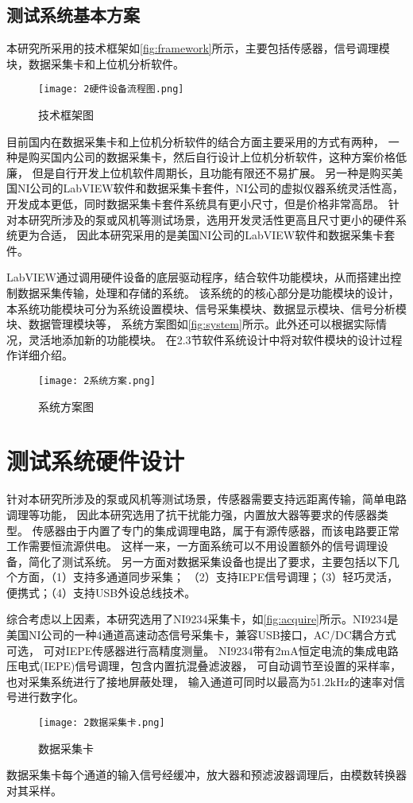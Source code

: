 \subsection{测试系统基本方案}
本研究所采用的技术框架如\autoref{fig:framework}所示，主要包括传感器，信号调理模块，数据采集卡和上位机分析软件。
\begin{figure}[htbp]
    \centering
    \texttt{[image: 2硬件设备流程图.png]}
    \caption{\label{fig:framework}技术框架图}
\end{figure}

目前国内在数据采集卡和上位机分析软件的结合方面主要采用的方式有两种，
一种是购买国内公司的数据采集卡，然后自行设计上位机分析软件，这种方案价格低廉，
但是自行开发上位机软件周期长，且功能有限还不易扩展。
另一种是购买美国NI公司的LabVIEW软件和数据采集卡套件，NI公司的虚拟仪器系统灵活性高，
开发成本更低，同时数据采集卡套件系统具有更小尺寸，但是价格非常高昂。
针对本研究所涉及的泵或风机等测试场景，选用开发灵活性更高且尺寸更小的硬件系统更为合适，
因此本研究采用的是美国NI公司的LabVIEW软件和数据采集卡套件。

LabVIEW通过调用硬件设备的底层驱动程序，结合软件功能模块，从而搭建出控制数据采集传输，处理和存储的系统。
该系统的的核心部分是功能模块的设计，本系统功能模块可分为系统设置模块、信号采集模块、数据显示模块、信号分析模块、数据管理模块等，
系统方案图如\autoref{fig:system}所示。此外还可以根据实际情况，灵活地添加新的功能模块。
在2.3节软件系统设计中将对软件模块的设计过程作详细介绍。
\begin{figure}[htbp]
    \centering
    \texttt{[image: 2系统方案.png]}
    \caption{\label{fig:system}系统方案图}
\end{figure}

\section{测试系统硬件设计}
针对本研究所涉及的泵或风机等测试场景，传感器需要支持远距离传输，简单电路调理等功能，
因此本研究选用了抗干扰能力强，内置放大器等要求的传感器类型。
传感器由于内置了专门的集成调理电路，属于有源传感器，而该电路要正常工作需要恒流源供电。
这样一来，一方面系统可以不用设置额外的信号调理设备，简化了测试系统。
另一方面对数据采集设备也提出了要求，主要包括以下几个方面，（1）支持多通道同步采集；
（2）支持IEPE信号调理；（3）轻巧灵活，便携式；（4）支持USB外设总线技术。

综合考虑以上因素，本研究选用了​NI9234采集卡，如\autoref{fig:acquire}所示。
​NI9234是美国NI公司的一种4通道高速动态信号采集卡，兼容USB接口，AC/DC耦合方式可选，
可对IEPE传感器进行高精度测量。
NI9234带有2mA恒定电流的集成电路压电式(IEPE)信号调理，包含内置抗混叠滤波器，
可自动调节至设置的采样率，也对采集系统进行了接地屏蔽处理，
输入通道可同时以最高为51.2$\mathrm{kHz}$的速率对信号进行数字化。
\begin{figure}[htbp]
    \centering
    \texttt{[image: 2数据采集卡.png]}
    \caption{\label{fig:acquire}数据采集卡}
\end{figure}
​
数据采集卡每个通道的输入信号经缓冲，放大器和预滤波器调理后，由模数转换器对其采样。

